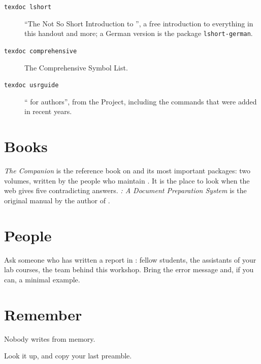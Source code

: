 \begin{description}
    \item[\texttt{texdoc lshort}] \enquote{The Not So Short Introduction to },
        a free introduction to everything in this handout and more;
        a German version is the package \texttt{lshort-german}.
    \item[\texttt{texdoc comprehensive}] The Comprehensive  Symbol List.
    \item[\texttt{texdoc usrguide}] \enquote{ for authors}, from the  Project,
        including the commands that were added in recent years.
\end{description}

\section{Books}\label{sec:books}

\textit{The  Companion} \parencite{companion2023} is the reference book on  and its most important packages:
two volumes, written by the people who maintain .
It is the place to look when the web gives five contradicting answers.
\textit{: A Document Preparation System} \parencite{lamport1994} is the original manual by the author of .

\section{People}\label{sec:people}

Ask someone who has written a report in :
fellow students, the assistants of your lab courses, the team behind this workshop.
Bring the error message and, if you can, a minimal example.

\section*{Remember}

\begin{center}
    \Large Nobody writes  from memory.

    \medskip
    {\large\color{black!60} Look it up, and copy your last preamble.\par}
\end{center}
